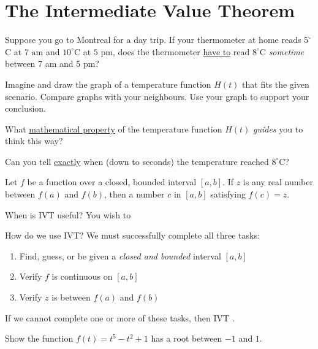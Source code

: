 \documentclass[../main.tex]{subfiles}
\begin{document}
 \section{The Intermediate Value Theorem}
  \faComments{} Suppose you go to Montreal for a day trip. If your thermometer at home reads \(5^{\circ}\)C at \(7 \text{ am}\) and \({10}^{\circ}\)C at \(5\text{ pm}\), does the thermometer \underline{have to} read \({8}^{\circ}\)C \emph{sometime} between 7 am and 5 pm?


  Imagine and draw the graph of a temperature function \(H(t)\) that fits the given scenario. Compare graphs with your neighbours. Use your graph to support your conclusion.

  \begin{figure}[!h]  %
    \centering
    
    \label{fig:label}
  \end{figure}

  What \underline{mathematical property} of the temperature function \(H(t)\) \emph{guides} you to think this way?

  Can you tell \underline{exactly} when (down to seconds) the temperature reached \(8^{\circ}\)C?

  \begin{mdframed}[style=withref]
    Let \(f\) be a \underline{\hspace{1in}} function over a closed, bounded interval \([a,b]\). If \(z\) is any real number between \(f(a)\) and \(f(b)\), then \underline{\hspace{1in}} a number \(c\) in \([a,b]\) satisfying \(f(c) = z\).

  \end{mdframed}

  When is IVT useful? You wish to 
  \large{}

  How do we use IVT? We must successfully complete all three tasks: 
  \begin{enumerate}[label=(IVT \arabic*)]
    \item Find, guess, or be given {a \emph{closed and bounded} interval \([a,b]\)}
    \item Verify {\(f\) is continuous on \([a,b]\)}
    \item Verify {\(z\) is between \(f(a)\) and \(f(b)\)}
  \end{enumerate}
  If we cannot complete one or more of these tasks, then IVT .

  \begin{example}
    Show the function \(f(t) = t^{5} - t^{2} + 1\) has a root between \(-1\) and \(1\).
  \end{example}
\end{document}
